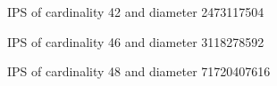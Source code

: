 \documentclass[12pt]{article}
\theoremstyle{theorem}
\theoremstyle{dfn}
\theoremstyle{remark}
\begin{document}
\begin{figure}[h!]
\parbox{1\linewidth}{\caption{IPS of cardinality 42 and diameter 2473117504}
\label{42_symm.png}}
\end{figure}

\begin{figure}[h!]
\parbox{1\linewidth}{\caption{IPS of cardinality 46 and diameter 3118278592}
\label{46_symm.png}}
\end{figure}

\begin{figure}[h!]
\parbox{1\linewidth}{\caption{IPS of cardinality 48 and diameter 71720407616}
\label{48_symm.png}}
\end{figure}
\end{document}
